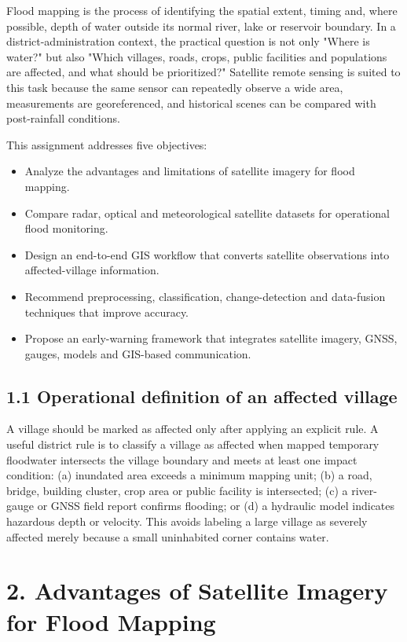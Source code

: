 \documentclass[11pt,a4paper]{article}
\begin{document}
Flood mapping is the process of identifying the spatial extent, timing and, where possible, depth of water outside its normal river, lake or reservoir boundary. In a district-administration context, the practical question is not only "Where is water?" but also "Which villages, roads, crops, public facilities and populations are affected, and what should be prioritized?" Satellite remote sensing is suited to this task because the same sensor can repeatedly observe a wide area, measurements are georeferenced, and historical scenes can be compared with post-rainfall conditions.

This assignment addresses five objectives:

\begin{itemize}
\item
  Analyze the advantages and limitations of satellite imagery for flood mapping.
\item
  Compare radar, optical and meteorological satellite datasets for operational flood monitoring.
\item
  Design an end-to-end GIS workflow that converts satellite observations into affected-village information.
\item
  Recommend preprocessing, classification, change-detection and data-fusion techniques that improve accuracy.
\item
  Propose an early-warning framework that integrates satellite imagery, GNSS, gauges, models and GIS-based communication.
\end{itemize}

\subsection{1.1 Operational definition of an affected village}\label{operational-definition-of-an-affected-village}

A village should be marked as affected only after applying an explicit rule. A useful district rule is to classify a village as affected when mapped temporary floodwater intersects the village boundary and meets at least one impact condition: (a) inundated area exceeds a minimum mapping unit; (b) a road, bridge, building cluster, crop area or public facility is intersected; (c) a river-gauge or GNSS field report confirms flooding; or (d) a hydraulic model indicates hazardous depth or velocity. This avoids labeling a large village as severely affected merely because a small uninhabited corner contains water.

\section{2. Advantages of Satellite Imagery for Flood Mapping}\label{advantages-of-satellite-imagery-for-flood-mapping}
\end{document}
